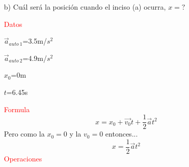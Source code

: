 \documentclass[letterpaper,12pt]{article}
\begin{document}
\begin{enumerate}
\begin {itemize}
     $$t=\frac{-b \pm \sqrt{b^{2}-4ac}}{2a}$$
     
     $$t=\frac{-(-4.9 m/s^{2})\pm \sqrt{(-4.9 m/s^{2})^{2}-4(\frac{7}{10}m/s^{2})(\frac{49}{20})m/s^{2}}}{2(\frac{7}{10}m/s^{2})}$$
     
     $$t=\frac{4.9 m/s^{2}\pm \sqrt{\frac{2401}{100}m^{2}/s^{4}-\frac{343}{50}m^{2}/s^{4}}}{\frac{7}{5}m/s^{2}}$$
     
    $$t=\frac{4.9 m/s^{2}\pm \sqrt{\frac{343}{20}m^{2}/s^{4}}}{\frac{7}{5}m/s^{2}}$$
     
    $$t_1=\frac{4.9 m/s^{2}+ \sqrt{\frac{343}{20}m^{2}/s^{4}}}{\frac{7}{5}m/s^{2}}=6.45s$$
    $$t_2=\frac{4.9 m/s^{2}- \sqrt{\frac{343}{20}m^{2}/s^{4}}}{\frac{7}{5}m/s^{2}}=0.54s$$
    
    Al analizar los resultados podemos observar que tenemos dos resultados, por lo tanto tomaremos el primero ($t_1$) debido a que es imposible que el carro dos lo alcanzara el carro uno en un tiempo de 0.54s.
    
    
    $\therefore$ En el tiempo 6.45s aproximadamente el carro dos alcanzo al auto uno. 
    
    \item[b)] Cuál será la posición cuando el inciso (a) ocurra, $x=?$
    
    {\textcolor{red}{Datos}}
    
    $\Vec{a}_{auto \ 1}$=3.5m/$s^{2}$
    
    $\Vec{a}_{auto \ 2}$=4.9m/$s^{2}$
    
    $x_{0}$=0m
    
    $t$=6.45s
    
    {\textcolor{red}{Formula}}
     \begin{equation}
      {x}={x_0}+\Vec{v_0}t+\frac{1}{2}\Vec{a}t^{2}
      \end{equation}
    Pero como la $x_0=0$ y la $v_0=0$ entonces...
    \begin{equation}
      {x}=\frac{1}{2}\Vec{a}t^{2}
      \end{equation}
     {\textcolor{red}{Operaciones}} 
     

\end{itemize}
\end{enumerate}
\end{document}
